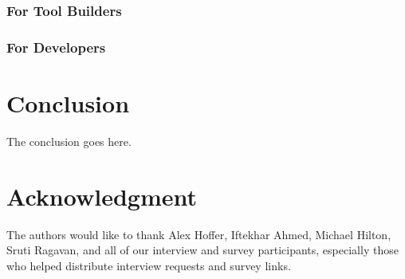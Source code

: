 \documentclass[conference]{IEEEtran}
\begin{document}
\subsubsection{For Tool Builders}
\subsubsection{For Developers}


\section{Conclusion}
The conclusion goes here.

\section*{Acknowledgment}

The authors would like to thank Alex Hoffer, Iftekhar Ahmed, Michael Hilton, Sruti Ragavan, and all of our interview and survey participants, especially those who helped distribute interview requests and survey links.

\nocite{*}

{}
%
%




\end{document}
